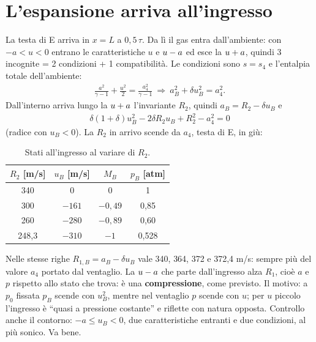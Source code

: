 \section*{L'espansione arriva all'ingresso}
La testa di E arriva in $x=L$ a $0{,}5\,\tau$. Da lì il gas entra dall'ambiente: con $-a<u<0$ entrano le caratteristiche
$u$ e $u-a$ ed esce la $u+a$, quindi 3 incognite = 2 condizioni + 1 compatibilità. Le condizioni sono $s=s_4$ e
l'entalpia totale dell'ambiente:
\begin{gather*}
  \frac{a^2}{\gamma-1}+\frac{u^2}{2}=\frac{a_4^2}{\gamma-1}\ \Rightarrow\ a_B^2+\delta u_B^2=a_4^2 .
\end{gather*}
Dall'interno arriva lungo la $u+a$ l'invariante $R_2$, quindi $a_B=R_2-\delta u_B$ e
\begin{gather*}
  \delta(1+\delta)u_B^2-2\delta R_2u_B+R_2^2-a_4^2=0
\end{gather*}
(radice con $u_B<0$). La $R_2$ in arrivo scende da $a_4$, testa di E, in giù:
\begin{table}[H]
  \centering
  \small
  \begin{tabular}{cccc}
    \toprule
    $R_2$ [m/s] & $u_B$ [m/s] & $M_B$ & $p_B$ [atm] \\
    \midrule
    340 & 0 & 0 & 1 \\
    300 & $-161$ & $-0{,}49$ & 0,85 \\
    260 & $-280$ & $-0{,}89$ & 0,60 \\
    248,3 & $-310$ & $-1$ & 0,528 \\
    \bottomrule
  \end{tabular}
  \caption{Stati all'ingresso al variare di $R_2$.}
  \label{tab:ingresso}
\end{table}
Nelle stesse righe $R_{1,B}=a_B-\delta u_B$ vale 340, 364, 372 e 372,4 m/s: sempre più del valore $a_4$ portato dal
ventaglio. La $u-a$ che parte dall'ingresso alza $R_1$, cioè $a$ e $p$ rispetto allo stato che trova: è una
\textbf{compressione}, come previsto. Il motivo: a $p_0$ fissata $p_B$ scende con $u_B^2$, mentre nel ventaglio $p$ scende
con $u$; per $u$ piccolo l'ingresso è ``quasi a pressione costante'' e riflette con natura opposta. Controllo anche il
contorno: $-a\le u_B<0$, due caratteristiche entranti e due condizioni, al più sonico. Va bene.


